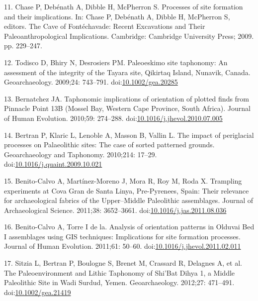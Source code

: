 \documentclass[]{article}
\begin{document}
\hypertarget{ref-chase_processes_2009}{}
11. Chase P, Debénath A, Dibble H, McPherron S. Processes of site
formation and their implications. In: Chase P, Debénath A, Dibble H,
McPherron S, editors. The Cave of Fontéchavade: Recent Excavations and
Their Paleoanthropological Implications. Cambridge: Cambridge University
Press; 2009. pp. 229--247.

\hypertarget{ref-todisco_paleoeskimo_2009}{}
12. Todisco D, Bhiry N, Desrosiers PM. Paleoeskimo site taphonomy: An
assessment of the integrity of the Tayara site, Qikirtaq Island,
Nunavik, Canada. Geoarchaeology. 2009;24: 743--791.
doi:\href{https://doi.org/10.1002/gea.20285}{10.1002/gea.20285}

\hypertarget{ref-bernatchez_taphonomic_2010}{}
13. Bernatchez JA. Taphonomic implications of orientation of plotted
finds from Pinnacle Point 13B (Mossel Bay, Western Cape Province, South
Africa). Journal of Human Evolution. 2010;59: 274--288.
doi:\href{https://doi.org/10.1016/j.jhevol.2010.07.005}{10.1016/j.jhevol.2010.07.005}

\hypertarget{ref-bertran_impact_2010}{}
14. Bertran P, Klaric L, Lenoble A, Masson B, Vallin L. The impact of
periglacial processes on Palaeolithic sites: The case of sorted
patterned grounds. Geoarchaeology and Taphonomy. 2010;214: 17--29.
doi:\href{https://doi.org/10.1016/j.quaint.2009.10.021}{10.1016/j.quaint.2009.10.021}

\hypertarget{ref-benito-calvo_trampling_2011}{}
15. Benito-Calvo A, Martínez-Moreno J, Mora R, Roy M, Roda X. Trampling
experiments at Cova Gran de Santa Linya, Pre-Pyrenees, Spain: Their
relevance for archaeological fabrics of the Upper--Middle Paleolithic
assemblages. Journal of Archaeological Science. 2011;38: 3652--3661.
doi:\href{https://doi.org/10.1016/j.jas.2011.08.036}{10.1016/j.jas.2011.08.036}

\hypertarget{ref-benito-calvo_analysis_2011}{}
16. Benito-Calvo A, Torre I de la. Analysis of orientation patterns in
Olduvai Bed I assemblages using GIS techniques: Implications for site
formation processes. Journal of Human Evolution. 2011;61: 50--60.
doi:\href{https://doi.org/10.1016/j.jhevol.2011.02.011}{10.1016/j.jhevol.2011.02.011}

\hypertarget{ref-sitzia_paleoenvironment_2012}{}
17. Sitzia L, Bertran P, Boulogne S, Brenet M, Crassard R, Delagnes A,
et al. The Paleoenvironment and Lithic Taphonomy of Shi'Bat Dihya 1, a
Middle Paleolithic Site in Wadi Surdud, Yemen. Geoarchaeology. 2012;27:
471--491.
doi:\href{https://doi.org/10.1002/gea.21419}{10.1002/gea.21419}
\end{document}
